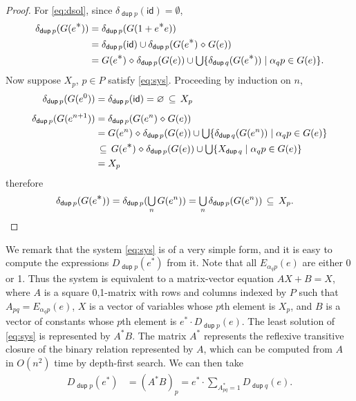 \documentclass{article}
\renewcommand\smash{\mathrel{\diamond}}
\newcommand\ssum{\mathop{\textstyle\sum}}
\newcommand\sbigcup{\mathop{\textstyle\bigcup}}
\newcommand\pdup{\mathop{\mathsf{dup}}}
\renewcommand\star{^{\textstyle *}}
\newcommand\id{\mathsf{id}}
\begin{document}
\begin{proof}
For \eqref{eq:dsol}, since $\delta_{\pdup p}(\id) = \emptyset$,
\begin{align*}
\delta_{\pdup p}(G(e\star))
&= \delta_{\pdup p}(G(1+e\star e))\\
&= \delta_{\pdup p}(\id) \cup \delta_{\pdup p}(G(e\star)\smash G(e))\\
&= G(e\star)\smash\delta_{\pdup p}(G(e)) \cup \sbigcup \set{\delta_{\pdup q}(G(e\star))}{\alpha_qp\in G(e)}.
\end{align*}
Now suppose $X_p$, $p\in P$ satisfy \eqref{eq:sys}.
Proceeding by induction on $n$,
\begin{align*}
\delta_{\pdup p}(G(e^0))
&= \delta_{\pdup p}(\id)
= \emptyset
\subs X_p\\[1ex]
\delta_{\pdup p}(G(e^{n+1}))
&= \delta_{\pdup p}(G(e^n)\smash G(e))\\
&= G(e^n)\smash\delta_{\pdup p}(G(e)) \cup \sbigcup \set{\delta_{\pdup q}(G(e^n))}{\alpha_qp\in G(e)}\\
&\subs G(e\star)\smash\delta_{\pdup p}(G(e)) \cup \sbigcup \set{X_{\pdup q}}{\alpha_qp\in G(e)}\\
&= X_p
\end{align*}
therefore
\begin{align*}
\delta_{\pdup p}(G(e\star))
&= \delta_{\pdup p}(\sbigcup_n G(e^n))
= \sbigcup_n\delta_{\pdup p}(G(e^n))
\subs X_p.
\end{align*}
\end{proof}

We remark that the system \eqref{eq:sys} is of a very simple form, and it is easy to compute the expressions $D_{\pdup p}(e\star)$ from it. Note that all $E_{\alpha_qp}(e)$ are either 0 or 1. Thus the system is equivalent to a matrix-vector equation $AX + B = X$, where $A$ is a square 0,1-matrix with rows and columns indexed by $P$ such that $A_{pq} = E_{\alpha_qp}(e)$, $X$ is a vector of variables whose $p$th element is $X_p$, and $B$ is a vector of constants whose $p$th element is $e\star\cdot D_{\pdup p}(e)$. The least solution of \eqref{eq:sys} is represented by $A\star B$. The matrix $A\star$ represents the reflexive transitive closure of the binary relation represented by $A$, which can be computed from $A$ in $O(n^2)$ time by depth-first search. We can then take
\begin{align*}
D_{\pdup p}(e\star) &= (A\star B)_p = e\star\cdot\ssum_{A^{\scriptstyle*}_{pq}=1} D_{\pdup q}(e).
\end{align*}
\end{document}

